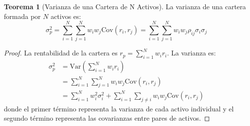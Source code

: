 \documentclass[12pt,a4paper]{article}
\theoremstyle{definition}
\newtheorem{teorema}{Teorema}[section]
\newcommand{\Var}{\text{Var}}
\newcommand{\Cov}{\text{Cov}}
\begin{document}
\begin{teorema}[Varianza de una Cartera de N Activos]
La varianza de una cartera formada por $N$ activos es:
\begin{equation}
\sigma_p^2 = \sum_{i=1}^{N} \sum_{j=1}^{N} w_i w_j \Cov(r_i, r_j) = \sum_{i=1}^{N} \sum_{j=1}^{N} w_i w_j \rho_{ij} \sigma_i \sigma_j
\end{equation}
\end{teorema}

\begin{proof}
La rentabilidad de la cartera es $r_p = \sum_{i=1}^{N} w_i r_i$. La varianza es:
\begin{align*}
\sigma_p^2 &= \Var\left(\sum_{i=1}^{N} w_i r_i\right) \\
&= \sum_{i=1}^{N} \sum_{j=1}^{N} w_i w_j \Cov(r_i, r_j) \\
&= \sum_{i=1}^{N} w_i^2 \sigma_i^2 + \sum_{i=1}^{N} \sum_{j \neq i} w_i w_j \Cov(r_i, r_j)
\end{align*}
donde el primer término representa la varianza de cada activo individual y el segundo término representa las covarianzas entre pares de activos.
\end{proof}
\end{document}
